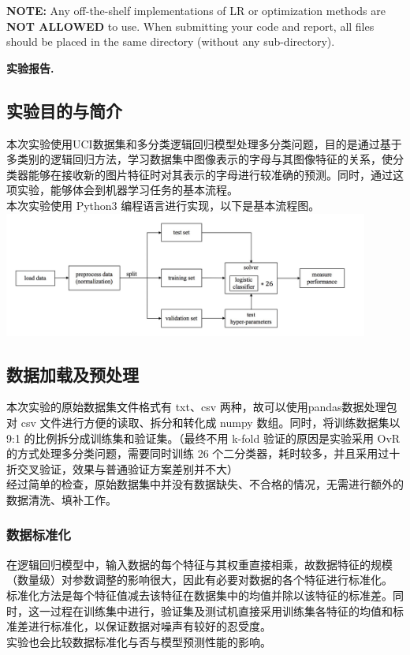 \documentclass{article}
\begin{document}
\textbf{NOTE:} Any off-the-shelf implementations of LR or optimization methods are \textbf{NOT ALLOWED} to use. When submitting your code and report, all files should be placed in the same directory (without any sub-directory).

\clearpage
\noindent\textbf{实验报告.}
\subsection{实验目的与简介}
本次实验使用UCI数据集和多分类逻辑回归模型处理多分类问题，目的是通过基于多类别的逻辑回归方法，学习数据集中图像表示的字母与其图像特征的关系，使分类器能够在接收新的图片特征时对其表示的字母进行较准确的预测。同时，通过这项实验，能够体会到机器学习任务的基本流程。\\
\indent 本次实验使用 Python3 编程语言进行实现，以下是基本流程图。\\
\indent \includegraphics[width = 0.9\textwidth]{flow-chart.jpg} \\

\subsection{数据加载及预处理}
本次实验的原始数据集文件格式有 txt、csv 两种，故可以使用pandas数据处理包对 csv 文件进行方便的读取、拆分和转化成 numpy 数组。同时，将训练数据集以 9:1 的比例拆分成训练集和验证集。（最终不用 k-fold 验证的原因是实验采用 OvR 的方式处理多分类问题，需要同时训练 26 个二分类器，耗时较多，并且采用过十折交叉验证，效果与普通验证方案差别并不大）\\
\indent 经过简单的检查，原始数据集中并没有数据缺失、不合格的情况，无需进行额外的数据清洗、填补工作。
\subsubsection{数据标准化}
\indent 在逻辑回归模型中，输入数据的每个特征与其权重直接相乘，故数据特征的规模（数量级）对参数调整的影响很大，因此有必要对数据的各个特征进行标准化。\\
\indent 标准化方法是每个特征值减去该特征在数据集中的均值并除以该特征的标准差。同时，这一过程在训练集中进行，验证集及测试机直接采用训练集各特征的均值和标准差进行标准化，以保证数据对噪声有较好的忍受度。\\
\indent 实验也会比较数据标准化与否与模型预测性能的影响。
\end{document}
